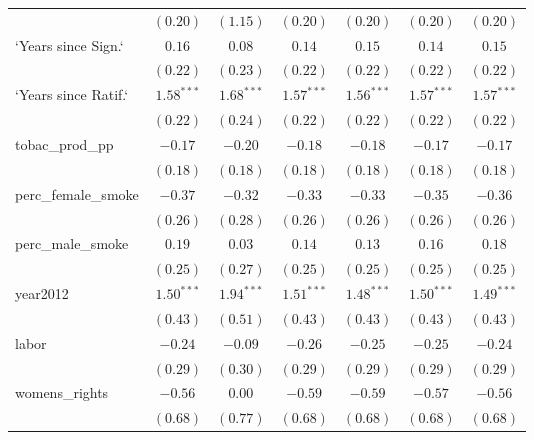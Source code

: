 \begin{table}[!h]
\begin{center}
\begin{tabular}{l c c c c c c }
                        & $(0.20)$     & $(1.15)$     & $(0.20)$     & $(0.20)$     & $(0.20)$     & $(0.20)$     \\
`Years since Sign.`     & $0.16$       & $0.08$       & $0.14$       & $0.15$       & $0.14$       & $0.15$       \\
                        & $(0.22)$     & $(0.23)$     & $(0.22)$     & $(0.22)$     & $(0.22)$     & $(0.22)$     \\
`Years since Ratif.`    & $1.58^{***}$ & $1.68^{***}$ & $1.57^{***}$ & $1.56^{***}$ & $1.57^{***}$ & $1.57^{***}$ \\
                        & $(0.22)$     & $(0.24)$     & $(0.22)$     & $(0.22)$     & $(0.22)$     & $(0.22)$     \\
tobac\_prod\_pp         & $-0.17$      & $-0.20$      & $-0.18$      & $-0.18$      & $-0.17$      & $-0.17$      \\
                        & $(0.18)$     & $(0.18)$     & $(0.18)$     & $(0.18)$     & $(0.18)$     & $(0.18)$     \\
perc\_female\_smoke     & $-0.37$      & $-0.32$      & $-0.33$      & $-0.33$      & $-0.35$      & $-0.36$      \\
                        & $(0.26)$     & $(0.28)$     & $(0.26)$     & $(0.26)$     & $(0.26)$     & $(0.26)$     \\
perc\_male\_smoke       & $0.19$       & $0.03$       & $0.14$       & $0.13$       & $0.16$       & $0.18$       \\
                        & $(0.25)$     & $(0.27)$     & $(0.25)$     & $(0.25)$     & $(0.25)$     & $(0.25)$     \\
year2012                & $1.50^{***}$ & $1.94^{***}$ & $1.51^{***}$ & $1.48^{***}$ & $1.50^{***}$ & $1.49^{***}$ \\
                        & $(0.43)$     & $(0.51)$     & $(0.43)$     & $(0.43)$     & $(0.43)$     & $(0.43)$     \\
labor                   & $-0.24$      & $-0.09$      & $-0.26$      & $-0.25$      & $-0.25$      & $-0.24$      \\
                        & $(0.29)$     & $(0.30)$     & $(0.29)$     & $(0.29)$     & $(0.29)$     & $(0.29)$     \\
womens\_rights          & $-0.56$      & $0.00$       & $-0.59$      & $-0.59$      & $-0.57$      & $-0.56$      \\
                        & $(0.68)$     & $(0.77)$     & $(0.68)$     & $(0.68)$     & $(0.68)$     & $(0.68)$     \\

\end{tabular}
\end{center}
\end{table}
